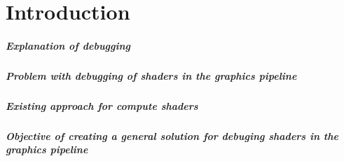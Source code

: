 
\chapter{Introduction}\label{cha:Introduction}

\paragraph{Explanation of debugging}

\paragraph{Problem with debugging of shaders in the graphics pipeline}

\paragraph{Existing approach for compute shaders}

\paragraph{Objective of creating a general solution for debuging shaders in the graphics pipeline}
